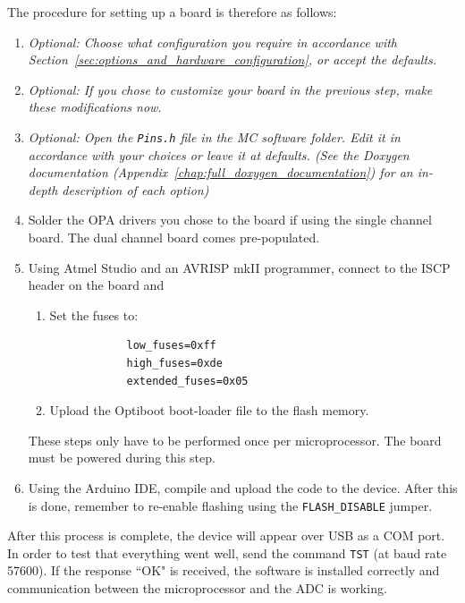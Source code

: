 \documentclass[11pt]{report}
\newcommand{\baudrate}{57600}
\begin{document}
The procedure for setting up a board is therefore as follows:

\begin{enumerate}
	\item \textit{Optional: Choose what configuration you require in accordance with Section~\ref{sec:options_and_hardware_configuration}, or accept the defaults.}
	\item \textit{Optional: If you chose to customize your board in the previous step, make these modifications now. }
	\item \textit{Optional: Open the {\tt Pins.h} file in the MC software folder. Edit it in accordance with your choices or leave it at defaults. (See the Doxygen documentation (Appendix~\ref{chap:full_doxygen_documentation}) for an in-depth description of each option)}

	\item Solder the OPA drivers you chose to the board if using the single channel board. The dual channel board comes pre-populated. 

	\item Using Atmel Studio and an AVRISP mkII programmer, connect to the ISCP header on the board and 

	\begin{enumerate}
		\item Set the fuses to:
		\begin{verbatim}
			low_fuses=0xff
			high_fuses=0xde
			extended_fuses=0x05
		\end{verbatim}
			
		\item Upload the Optiboot boot-loader file  to the flash memory. 
	\end{enumerate}
	These steps only have to be performed once per microprocessor. The board must be powered during this step. 
	
	\item Using the Arduino IDE, compile and upload the code to the device. After this is done, remember to re-enable flashing using the {\tt FLASH\_DISABLE} jumper. 
	
\end{enumerate}

After this process is complete, the device will appear over USB as a COM port. In order to test that everything went well, send the command {\tt *TST} (at baud rate \baudrate). If the response ``OK" is received, the software is installed correctly and communication between the microprocessor and the ADC is working. 
\end{document}
